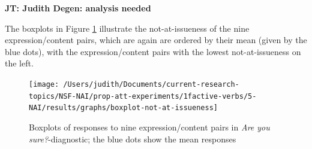 \documentclass[11pt,fleqn]{article}
\newcommand{\6}{\mbox{$[\hspace*{-.6mm}[$}}
\newcommand{\9}{\mbox{$]\hspace*{-.6mm}]$}}
\newcommand{\jt}[1]{\textbf{\color{blue}JT: #1}}
\begin{document}
\jt{Judith Degen: analysis needed}

The boxplots in Figure \ref{f-exp2a} illustrate the not-at-issueness of the nine expression/content pairs, which are again are ordered by their mean (given by the blue dots), with the expression/content pairs with the lowest not-at-issueness on the left. 

\begin{figure}[!h]

\begin{center}

\texttt{[image: /Users/judith/Documents/current-research-topics/NSF-NAI/prop-att-experiments/1factive-verbs/5-NAI/results/graphs/boxplot-not-at-issueness]}
\end{center}

\caption{Boxplots of responses to nine expression/content pairs in {\em Are you sure?}-diagnostic; the blue dots show the mean responses}\label{f-exp2a}
\end{figure}
\end{document}

